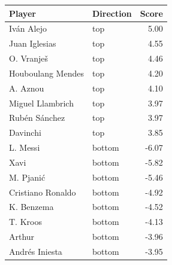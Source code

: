 
\begin{tabular}{llr}
\toprule
Player & Direction & Score\\
\midrule
Iván Alejo & top & 5.00\\
Juan Iglesias & top & 4.55\\
O. Vranješ & top & 4.46\\
Houboulang Mendes & top & 4.20\\
A. Aznou & top & 4.10\\
Miguel Llambrich & top & 3.97\\
Rubén Sánchez & top & 3.97\\
Davinchi & top & 3.85\\
L. Messi & bottom & -6.07\\
Xavi & bottom & -5.82\\
M. Pjanić & bottom & -5.46\\
Cristiano Ronaldo & bottom & -4.92\\
K. Benzema & bottom & -4.52\\
T. Kroos & bottom & -4.13\\
Arthur & bottom & -3.96\\
Andrés Iniesta & bottom & -3.95\\
\bottomrule
\end{tabular}
